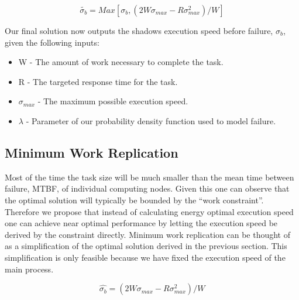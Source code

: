 \begin{equation}
\label{closed_form_sigma_b}
\tilde{\sigma_b}=Max[\sigma_b, (2 W \sigma_{max} - R \sigma_{max}^2)/W]
\end{equation}

Our final solution now outputs the shadows execution speed before
failure, $\sigma_b$, given the following inputs:
\begin{itemize}
\item
W - The amount of work necessary to complete the task.
\item
R - The targeted response time for the task.
\item
$\sigma_{max}$ - The maximum possible execution speed.
\item
$\lambda$ - Parameter of our probability density function used to model failure.
\end{itemize}

\subsection{Minimum Work Replication}
\label{minium_work_replication}

Most of the time the task size will be much smaller than the mean time
between failure, MTBF, of individual computing nodes. Given this one
can observe that the optimal solution will typically be bounded by the
``work constraint''. Therefore we propose that instead of calculating
energy optimal execution speed one can achieve near optimal
performance by letting the execution speed be derived by the
constraint directly. Minimum work replication can be thought of as a
simplification of the optimal solution derived in the previous
section. This simplification is only feasible because we have fixed
the execution speed of the main process.

\begin{equation}
\label{minimum_work_sigma_b}
\hat{\sigma_b}=(2 W \sigma_{max} - R \sigma_{max}^2)/W
\end{equation}

